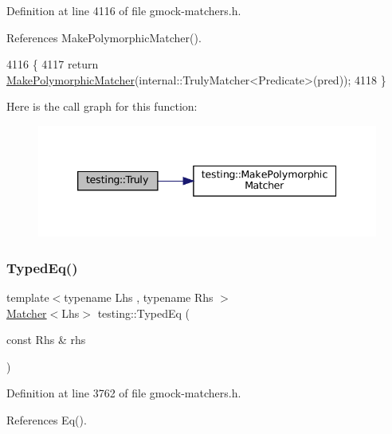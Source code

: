 Definition at line 4116 of file gmock-\/matchers.\+h.



References Make\+Polymorphic\+Matcher().


\begin{DoxyCode}
4116                       \{
4117   \textcolor{keywordflow}{return} \hyperlink{namespacetesting_a667ca94f190ec2e17ee2fbfdb7d3da04}{MakePolymorphicMatcher}(internal::TrulyMatcher<Predicate>(pred));
4118 \}
\end{DoxyCode}
Here is the call graph for this function\+:
\nopagebreak
\begin{figure}[H]
\begin{center}
\leavevmode
\includegraphics[width=339pt]{namespacetesting_a5faf05cfaae6074439960048e478b1c8_cgraph}
\end{center}
\end{figure}
\mbox{\label{namespacetesting_a57c9aba17aaa27d818e80a1eec81070f}} 
\subsubsection{\texorpdfstring{Typed\+Eq()}{TypedEq()}}
{\footnotesize\ttfamily template$<$typename Lhs , typename Rhs $>$ \\
\hyperlink{classtesting_1_1Matcher}{Matcher}$<$Lhs$>$ testing\+::\+Typed\+Eq (\begin{DoxyParamCaption}\item[{const Rhs \&}]{rhs }\end{DoxyParamCaption})\hspace{0.3cm}{\ttfamily [inline]}}



Definition at line 3762 of file gmock-\/matchers.\+h.



References Eq().


